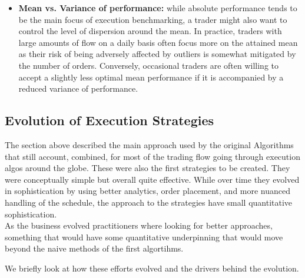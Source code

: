 \begin{itemize}
One should also ask themselves if a buy child order finally getting filled passively after being re-pegged successively to an increasing bid price represents a better execution than having paid for the spread right at the beginning of the period\footnote{As throughout this book, the reader is encouraged to remain critical when analyzing performance benchmarks and metrics, and eventually create more sophisticated versions of them to more accurately capture existing trade offs.}. 
\item \textbf{Mean vs. Variance of performance:} while absolute performance tends to be the main focus of execution benchmarking, a trader might also want to control the level of dispersion around the mean. In practice, traders with large amounts of flow on a daily basis often focus more on the attained mean as their risk of being adversely affected by outliers is somewhat mitigated by the number of orders. Conversely, occasional traders are often willing to accept a slightly less optimal mean performance if it is accompanied by a reduced variance of performance.
\end{itemize}

\subsection{Evolution of Execution Strategies}
The section above described the main approach used by the original Algorithms that still account, combined, for most of the trading flow going through execution algos around the globe. These were also the  first strategies to be created. They were conceptually simple but overall quite effective. While over time they evolved in sophistication by using better analytics, order placement, and more nuanced handling of the schedule, the approach to the strategies have small quantitative sophistication.\\

As the business evolved practitioners where looking for better approaches, something that would have some quantitative underpinning that would move beyond the naive methods of the first algortihms.

We briefly look at how these efforts evolved and the drivers behind the evolution.

